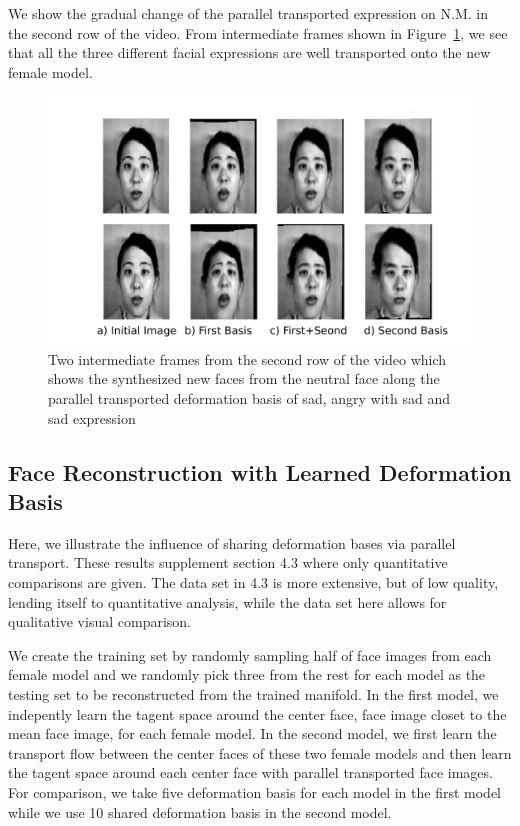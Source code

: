 \documentclass[runningheads]{llncs}
\begin{document}
We show the gradual change of the parallel transported expression on N.M. in the second row of the video. From intermediate frames shown in Figure~\ref{fig:v2}, we see that all the three different facial expressions are well transported onto the new female model.
\begin{figure}[t]
    \centering
    \includegraphics[height=0.6\columnwidth]{figs/V2.pdf}
    \caption{Two intermediate frames from the second row of the video which shows the synthesized new faces from the neutral face along the parallel transported deformation basis of sad, angry with sad and sad expression}
    \label{fig:v2}
\end{figure}

\subsection{Face Reconstruction with Learned Deformation Basis}
Here, we illustrate the influence of sharing deformation bases via parallel transport. These results supplement section 4.3 where only quantitative comparisons are given. The data set in 4.3 is more extensive, but of low quality, lending itself to quantitative analysis, while the data set here allows for qualitative visual comparison.

We create the training set by randomly sampling half of face images from each female model and we randomly pick three from the rest for each model as the testing set to be reconstructed from the trained manifold.
In the first model, we indepently learn the tagent space around the center face, face image closet to the mean face image, for each female model.
In the second model, we first learn the transport flow between the center faces of these two female models and then learn the tagent space around each center face with parallel transported face images.
For comparison, we take five deformation basis for each model in the first model while we use 10 shared deformation basis in the second model.
\end{document}
